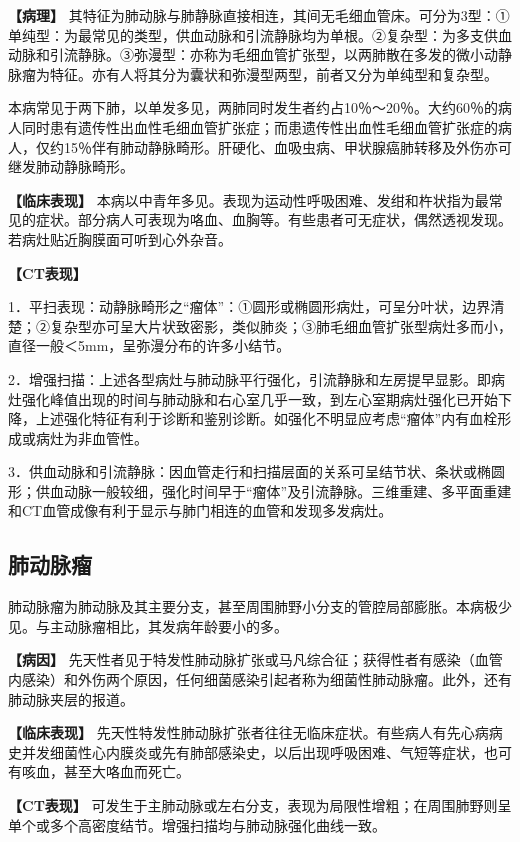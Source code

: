 \textbf{【病理】}
其特征为肺动脉与肺静脉直接相连，其间无毛细血管床。可分为3型：①单纯型：为最常见的类型，供血动脉和引流静脉均为单根。②复杂型：为多支供血动脉和引流静脉。③弥漫型：亦称为毛细血管扩张型，以两肺散在多发的微小动静脉瘤为特征。亦有人将其分为囊状和弥漫型两型，前者又分为单纯型和复杂型。

本病常见于两下肺，以单发多见，两肺同时发生者约占10％～20％。大约60％的病人同时患有遗传性出血性毛细血管扩张症；而患遗传性出血性毛细血管扩张症的病人，仅约15％伴有肺动静脉畸形。肝硬化、血吸虫病、甲状腺癌肺转移及外伤亦可继发肺动静脉畸形。

\textbf{【临床表现】}
本病以中青年多见。表现为运动性呼吸困难、发绀和杵状指为最常见的症状。部分病人可表现为咯血、血胸等。有些患者可无症状，偶然透视发现。若病灶贴近胸膜面可听到心外杂音。

\textbf{【CT表现】}

1．平扫表现：动静脉畸形之“瘤体”：①圆形或椭圆形病灶，可呈分叶状，边界清楚；②复杂型亦可呈大片状致密影，类似肺炎；③肺毛细血管扩张型病灶多而小，直径一般＜5mm，呈弥漫分布的许多小结节。

2．增强扫描：上述各型病灶与肺动脉平行强化，引流静脉和左房提早显影。即病灶强化峰值出现的时间与肺动脉和右心室几乎一致，到左心室期病灶强化已开始下降，上述强化特征有利于诊断和鉴别诊断。如强化不明显应考虑“瘤体”内有血栓形成或病灶为非血管性。

3．供血动脉和引流静脉：因血管走行和扫描层面的关系可呈结节状、条状或椭圆形；供血动脉一般较细，强化时间早于“瘤体”及引流静脉。三维重建、多平面重建和CT血管成像有利于显示与肺门相连的血管和发现多发病灶。

\subsection{肺动脉瘤}

肺动脉瘤为肺动脉及其主要分支，甚至周围肺野小分支的管腔局部膨胀。本病极少见。与主动脉瘤相比，其发病年龄要小的多。

\textbf{【病因】}
先天性者见于特发性肺动脉扩张或马凡综合征；获得性者有感染（血管内感染）和外伤两个原因，任何细菌感染引起者称为细菌性肺动脉瘤。此外，还有肺动脉夹层的报道。

\textbf{【临床表现】}
先天性特发性肺动脉扩张者往往无临床症状。有些病人有先心病病史并发细菌性心内膜炎或先有肺部感染史，以后出现呼吸困难、气短等症状，也可有咳血，甚至大咯血而死亡。

\textbf{【CT表现】}
可发生于主肺动脉或左右分支，表现为局限性增粗；在周围肺野则呈单个或多个高密度结节。增强扫描均与肺动脉强化曲线一致。

